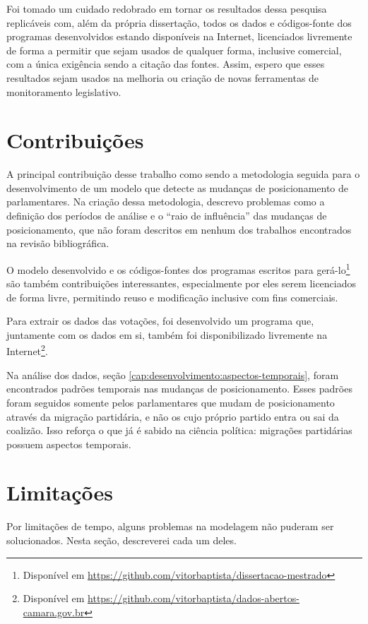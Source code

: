 \documentclass[a4paper,titlepage]{ppgi}\usepackage[]{graphicx}\usepackage[]{color}
\begin{document}
Foi tomado um cuidado redobrado em tornar os resultados dessa pesquisa
replicáveis com, além da própria dissertação, todos os dados e códigos-fonte
dos programas desenvolvidos estando disponíveis na Internet, licenciados
livremente de forma a permitir que sejam usados de qualquer forma, inclusive
comercial, com a única exigência sendo a citação das fontes. Assim, espero que
esses resultados sejam usados na melhoria ou criação de novas ferramentas de
monitoramento legislativo.

\section{Contribuições}

A principal contribuição desse trabalho como sendo a metodologia
seguida para o desenvolvimento de um modelo que detecte as mudanças de
posicionamento de parlamentares. Na criação dessa metodologia, descrevo
problemas como a definição dos períodos de análise e o ``raio de influência''
das mudanças de posicionamento, que não foram descritos em nenhum dos trabalhos
encontrados na revisão bibliográfica.

O modelo desenvolvido e os códigos-fontes dos programas escritos para
gerá-lo\footnote{Disponível em
\url{https://github.com/vitorbaptista/dissertacao-mestrado}} são também
contribuições interessantes, especialmente por eles serem licenciados de forma
livre, permitindo reuso e modificação inclusive com fins comerciais.

Para extrair os dados das votações, foi desenvolvido um programa que,
juntamente com os dados em si, também foi disponibilizado livremente na
Internet\footnote{Disponível em
\url{https://github.com/vitorbaptista/dados-abertos-camara.gov.br}}.

Na análise dos dados, seção \ref{cap:desenvolvimento:aspectos-temporais}, foram
encontrados padrões temporais nas mudanças de posicionamento. Esses padrões
foram seguidos somente pelos parlamentares que mudam de posicionamento através
da migração partidária, e não os cujo próprio partido entra ou sai da coalizão.
Isso reforça o que já é sabido na ciência política: migrações partidárias
possuem aspectos temporais.

\section{Limitações}
\label{cap:conclusao:limitacoes}

Por limitações de tempo, alguns problemas na modelagem não puderam ser
solucionados. Nesta seção, descreverei cada um deles.
\end{document}
